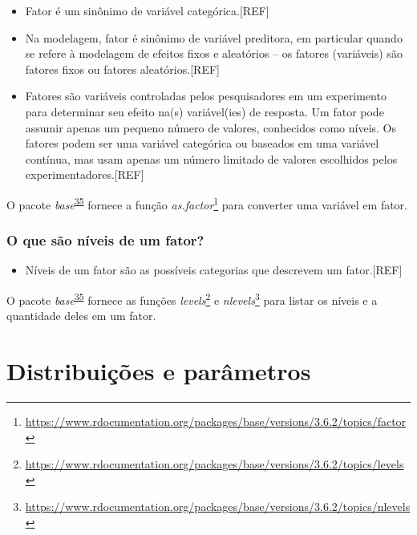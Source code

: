\documentclass[
  a4paper,
]{book}
\providecommand{\tightlist}{%
  \setlength{\itemsep}{0pt}\setlength{\parskip}{0pt}}
\renewcommand{\href}[2]{#2\footnote{\url{#1}}}
\newenvironment{infobox}[1]
  {
  \begin{itemize}
  \renewcommand{\labelitemi}{
    \raisebox{-.7\height}[0pt][0pt]{
      {\setkeys{Gin}{width=3em,keepaspectratio}
        \texttt{[image: \#1]}}
    }
  }
  \setlength{\fboxsep}{1em}
  \begin{blackbox}
  \item
  }
  {
  \end{blackbox}
  \end{itemize}
  }
\begin{document}
\begin{itemize}
\item
  Fator é um sinônimo de variável categórica.{[}REF{]}
\item
  Na modelagem, fator é sinônimo de variável preditora, em particular quando se refere à modelagem de efeitos fixos e aleatórios -- os fatores (variáveis) são fatores fixos ou fatores aleatórios.{[}REF{]}
\item
  Fatores são variáveis controladas pelos pesquisadores em um experimento para determinar seu efeito na(s) variável(ies) de resposta. Um fator pode assumir apenas um pequeno número de valores, conhecidos como níveis. Os fatores podem ser uma variável categórica ou baseados em uma variável contínua, mas usam apenas um número limitado de valores escolhidos pelos experimentadores.{[}REF{]}
\end{itemize}

\begin{infobox}{images/Rlogo}
O pacote \emph{base}\textsuperscript{\protect\hyperlink{ref-base-2}{35}} fornece a função \href{https://www.rdocumentation.org/packages/base/versions/3.6.2/topics/factor}{\emph{as.factor}} para converter uma variável em fator.

\end{infobox}

\hypertarget{o-que-suxe3o-nuxedveis-de-um-fator}{%
\subsection{O que são níveis de um fator?}\label{o-que-suxe3o-nuxedveis-de-um-fator}}

\begin{itemize}
\tightlist
\item
  Níveis de um fator são as possíveis categorias que descrevem um fator.{[}REF{]}
\end{itemize}

\begin{infobox}{images/Rlogo}
O pacote \emph{base}\textsuperscript{\protect\hyperlink{ref-base-2}{35}} fornece as funções \href{https://www.rdocumentation.org/packages/base/versions/3.6.2/topics/levels}{\emph{levels}} e \href{https://www.rdocumentation.org/packages/base/versions/3.6.2/topics/nlevels}{\emph{nlevels}} para listar os níveis e a quantidade deles em um fator.

\end{infobox}

\hypertarget{distribuicoes-parametros}{%
\chapter{\texorpdfstring{\textbf{Distribuições e parâmetros}}{Distribuições e parâmetros}}\label{distribuicoes-parametros}}
\end{document}

